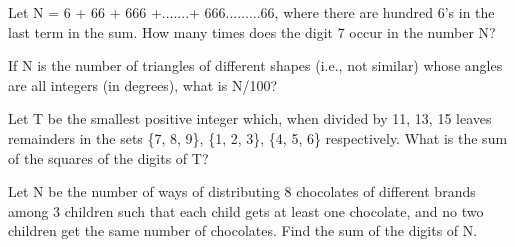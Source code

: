 \item Let N = 6 + 66 + 666 +.......+ 666.........66, where there are hundred 6's in the last term in the sum. How many times does the digit 7 occur in the number N?

\item If N is the number of triangles of different shapes (i.e., not similar) whose angles are all integers (in degrees), what is N/100?

\item Let T be the smallest positive integer which, when divided by 11, 13, 15 leaves remainders in the sets \{7, 8, 9\}, \{1, 2, 3\}, \{4, 5, 6\} respectively. What is the sum of the squares of the digits of T?

\item Let N be the number of ways of distributing 8 chocolates of different brands among 3 children such that each child gets at least one chocolate, and no two children get the same number of chocolates. Find the sum of the digits of N.
